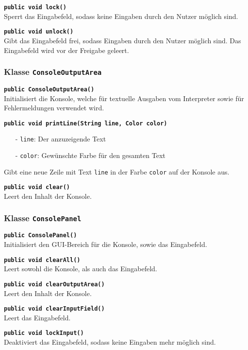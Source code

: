 \documentclass[parskip=full,11pt,twoside]{scrartcl}
\begin{document}
\textbf{\texttt{public void lock()}}\\
Sperrt das Eingabefeld, sodass keine Eingaben durch den Nutzer möglich sind.

\textbf{\texttt{public void unlock()}}\\
Gibt das Eingabefeld frei, sodass Eingaben durch den Nutzer möglich sind. Das Eingabefeld wird vor der Freigabe geleert.

\subsubsection{Klasse \texttt{ConsoleOutputArea}}

\textbf{\texttt{public ConsoleOutputArea()}}\\
Initialisiert die Konsole, welche für textuelle Ausgaben vom Interpreter sowie für Fehlermeldungen verwendet wird.

\textbf{\texttt{public void printLine(String line, Color color)}}
\begin{itemize}[noitemsep]
	\item[-] \texttt{line}: Der anzuzeigende Text
	\item[-] \texttt{color}: Gewünschte Farbe für den gesamten Text
\end{itemize}
Gibt eine neue Zeile mit Text \texttt{line} in der Farbe \texttt{color} auf der Konsole aus.

\textbf{\texttt{public void clear()}}\\
Leert den Inhalt der Konsole.

\subsubsection{Klasse \texttt{ConsolePanel}}

\textbf{\texttt{public ConsolePanel()}}\\
Initialisiert den GUI-Bereich für die Konsole, sowie das Eingabefeld.

\textbf{\texttt{public void clearAll()}}\\
Leert sowohl die Konsole, als auch das Eingabefeld.

\textbf{\texttt{public void clearOutputArea()}}\\
Leert den Inhalt der Konsole.

\textbf{\texttt{public void clearInputField()}}\\
Leert das Eingabefeld.

\textbf{\texttt{public void lockInput()}}\\
Deaktiviert das Eingabefeld, sodass keine Eingaben mehr möglich sind.
\end{document}
